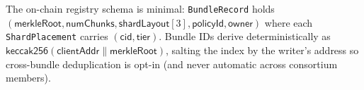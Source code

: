 The on-chain registry schema is minimal: \texttt{BundleRecord} holds \((\textsf{merkleRoot}, \textsf{numChunks}, \textsf{shardLayout}[3], \textsf{policyId}, \textsf{owner})\) where each \texttt{ShardPlacement} carries \((\textsf{cid}, \textsf{tier})\). Bundle IDs derive deterministically as \(\textsf{keccak256}(\textsf{clientAddr} \mathbin{\|} \textsf{merkleRoot})\), salting the index by the writer's address so cross-bundle deduplication is opt-in (and never automatic across consortium members).
